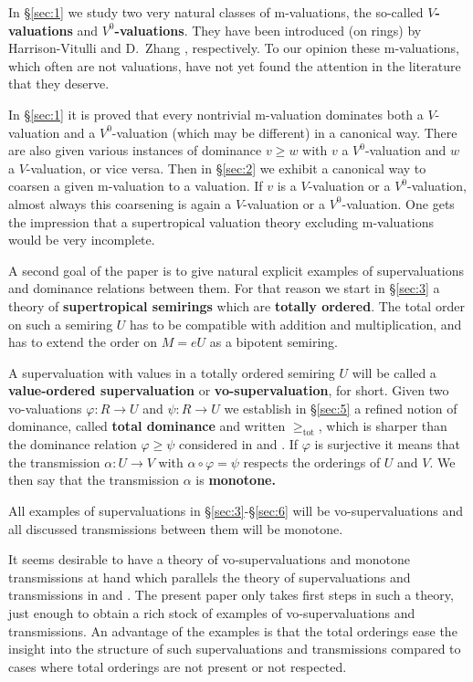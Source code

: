 \documentclass [12pt,a4paper,reqno]{amsart}
\begin{document}
In \S\ref{sec:1} we study two very natural classes of
{m}-valuations, the so-called \textbf{$V$-valuations} and
\textbf{${V^0}$-valuations}. They have been introduced  (on rings)
by Harrison-Vitulli \cite{HV1} and D.~Zhang \cite{Z},
respectively. To our opinion these {m}-valuations, which often are
not valuations, have not yet found the attention in the literature
that  they deserve.

In \S\ref{sec:1} it is proved that every nontrivial {m}-valuation
dominates both a $V$-valuation and a ${V^0}$-valuation (which may be
different) in a canonical way. There are also given various
instances of dominance $v \geq w$  with $v$ a ${V^0}$-valuation and
$w$ a $V$-valuation, or vice versa. Then in \S\ref{sec:2} we
exhibit a canonical way to coarsen a given {m}-valuation to a
valuation. If $v$ is a $V$-valuation or a ${V^0}$-valuation, almost
always this coarsening is again a $V$-valuation or a
${V^0}$-valuation. One gets the impression that a supertropical
valuation theory excluding {m}-valuations would be very incomplete.

A second goal of the paper is to give natural explicit examples of
supervaluations and dominance relations between them.  For that
reason  we start in \S\ref{sec:3} a theory of
\textbf{supertropical semirings} which are \textbf{totally
ordered}. The total order on such a semiring $U$  has to be
compatible with addition and multiplication, and has to extend the
order on $M = eU$ as a bipotent semiring.

 A supervaluation with values in a totally ordered semiring $U$
 will be called a \textbf{value-ordered supervaluation} or
 \textbf{{vo}-supervaluation}, for short. Given two {vo}-valuations ${\varphi}: R \to
 U$ and
 $\psi: R \to U$ we establish in \S\ref{sec:5} a refined notion of
 dominance, called \textbf{total dominance} and written
 $\geq_{\operatorname{tot}}$, which is sharper than the dominance relation ${\varphi} \geq
 \psi$ considered in \cite{IKR1}  and \cite{IKR2}. If ${\varphi}$ is
 surjective it means that the transmission ${\alpha} : U \to V$  with
 ${\alpha} \circ {\varphi} = \psi$ respects the orderings of $U$ and $V$. We
 then say that the transmission ${\alpha}$ is \textbf{monotone.}

 All examples of supervaluations in \S\ref{sec:3}-\S\ref{sec:6}
 will be {vo}-supervaluations and all discussed  transmissions between
 them will be monotone.

It seems desirable to have a theory of {vo}-supervaluations and
monotone transmissions at hand which parallels the theory of
supervaluations and transmissions in  \cite{IKR1}  and
\cite{IKR2}. The present paper only takes first steps in such a
theory, just enough to obtain a rich  stock of examples of
{vo}-supervaluations and transmissions. An advantage of the
examples is that the total orderings ease the insight into the
structure of such supervaluations and transmissions compared to
cases where total orderings are not present or not respected.
\end{document}
